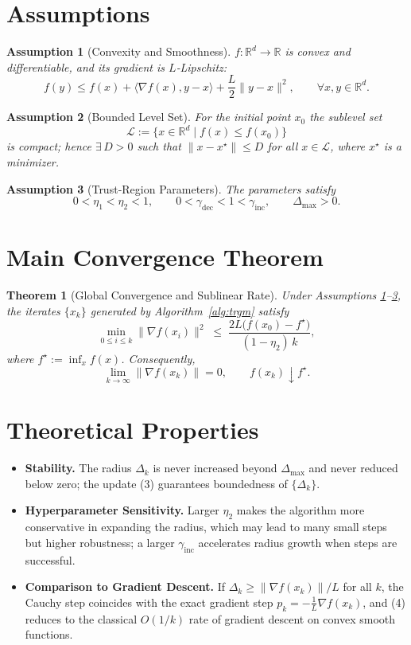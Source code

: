 \documentclass{article}
\newtheorem{theorem}{Theorem}
\newtheorem{assumption}{Assumption}
\begin{document}
\section*{Assumptions}
\begin{assumption}[Convexity and Smoothness]\label{as:convex}
$f:\mathbb{R}^d\to\mathbb{R}$ is convex and differentiable, and its gradient is $L$‑Lipschitz:
\[
f(y)\le f(x)+\langle\nabla f(x),y-x\rangle+\frac{L}{2}\|y-x\|^2,\qquad\forall x,y\in\mathbb{R}^d.
\]
\end{assumption}
\begin{assumption}[Bounded Level Set]\label{as:bounded}
For the initial point $x_0$ the sublevel set 
\[
\mathcal{L}:=\{x\in\mathbb{R}^d\mid f(x)\le f(x_0)\}
\]
is compact; hence $\exists\,D>0$ such that $\|x-x^\star\|\le D$ for all $x\in\mathcal{L}$, where $x^\star$ is a minimizer.
\end{assumption}
\begin{assumption}[Trust‑Region Parameters]\label{as:params}
The parameters satisfy
\[
0<\eta_1<\eta_2<1,\qquad 0<\gamma_{\text{dec}}<1<\gamma_{\text{inc}},\qquad \Delta_{\max}>0.
\]
\end{assumption}

\section*{Main Convergence Theorem}
\begin{theorem}[Global Convergence and Sublinear Rate]\label{thm:main}
Under Assumptions \ref{as:convex}–\ref{as:params}, the iterates $\{x_k\}$ generated by Algorithm~\ref{alg:trgm} satisfy
\[
\min_{0\le i\le k}\|\nabla f(x_i)\|^2\;\le\;\frac{2L\bigl(f(x_0)-f^\star\bigr)}{(1-\eta_2)\,k},
\tag{4}
\]
where $f^\star:=\inf_{x}f(x)$. Consequently,
\[
\lim_{k\to\infty}\|\nabla f(x_k)\|=0,\qquad
f(x_k)\downarrow f^\star.
\]
\end{theorem}

\section*{Theoretical Properties}
\begin{itemize}
\item \textbf{Stability.} The radius $\Delta_k$ is never increased beyond $\Delta_{\max}$ and never reduced below zero; the update (3) guarantees boundedness of $\{\Delta_k\}$.
\item \textbf{Hyperparameter Sensitivity.} Larger $\eta_2$ makes the algorithm more conservative in expanding the radius, which may lead to many small steps but higher robustness; a larger $\gamma_{\text{inc}}$ accelerates radius growth when steps are successful.
\item \textbf{Comparison to Gradient Descent.} If $\Delta_k\ge \|\nabla f(x_k)\|/L$ for all $k$, the Cauchy step coincides with the exact gradient step $p_k=-\frac{1}{L}\nabla f(x_k)$, and (4) reduces to the classical $O(1/k)$ rate of gradient descent on convex smooth functions.
\end{itemize}
\end{document}
